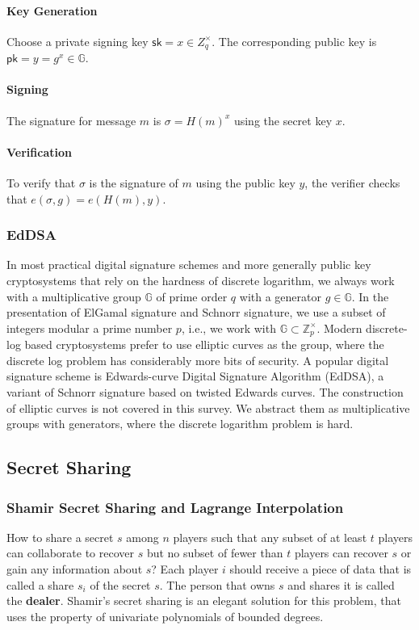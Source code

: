 \paragraph{Key Generation} Choose a private signing key $\mathsf{sk}=x\in Z_q^\times$. The corresponding public key is $\mathsf{pk}=y=g^x \in \mathbb{G}$. 

\paragraph{Signing} The signature for message $m$ is $\sigma=H(m)^x$ using the secret key $x$.  
\paragraph{Verification} To verify that $\sigma$ is the signature of $m$ using the public key $y$, the verifier checks that $e(\sigma, g) = e(H(m), y)$. 

\subsubsection{EdDSA}
In most practical digital signature schemes and more generally public key cryptosystems that rely on the hardness of discrete logarithm, we always work with a multiplicative group $\mathbb{G}$ of prime order $q$ with a generator $g\in\mathbb{G}$. In the presentation of ElGamal signature and Schnorr signature, we use a subset of integers modular a prime number $p$, i.e., we work with $\mathbb{G}\subset \mathbb{Z}_p^\times$. Modern discrete-log based cryptosystems prefer to use elliptic curves as the group, where the discrete log problem has considerably more bits of security. A popular digital signature scheme is Edwards-curve Digital Signature Algorithm (EdDSA), a variant of Schnorr signature based on twisted Edwards curves. The construction of elliptic curves is not covered in this survey. We abstract them as multiplicative groups with generators, where the discrete logarithm problem is hard. 


\subsection{Secret Sharing}
\subsubsection{Shamir Secret Sharing and Lagrange Interpolation}
How to share a secret $s$ among $n$ players such that any subset of at least $t$ players can collaborate to recover $s$ but no subset of fewer than $t$ players can recover $s$ or gain any information about $s$? Each player $i$ should receive a piece of data that is called a share $s_i$ of the secret $s$. The person that owns $s$ and shares it is called the \textbf{dealer}. Shamir's secret sharing is an elegant solution for this problem, that uses the property of univariate polynomials of bounded degrees. 

